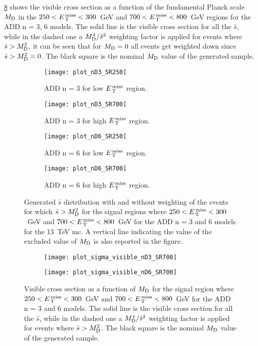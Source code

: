 \cref{fig:vis_sigma_trunc} shows the visible cross section as a function of the
fundamental Planck scale $M_\mathrm{D}$ in the $250 < E_\mathrm{\, T}^\mathrm{\, miss} < 300$~GeV and
$700 < E_\mathrm{\, T}^\mathrm{\, miss} < 800$~GeV regions for the ADD n = 3, 6 models. The solid line is
the visible cross section for all the $\hat{s}$, while in the dashed one a
$M_\mathrm{D}^4/\hat{s}^2$ weighting factor is applied for events where
$\hat{s} > M_\mathrm{D}^2$, it can be seen that for $M_\mathrm{D} = 0$ all events get weighted
down since $\hat{s} > M_\mathrm{D}^2 = 0$. The black square is the nominal $M_\mathrm{D}$ value of
the generated sample.
\begin{figure}[!h]
  \centering
  \begin{subfigure}{.48\linewidth}
    \texttt{[image: plot\_nD3\_SR250]}
    \caption{ADD n = 3 for low $E_\mathrm{\, T}^\mathrm{\, miss}$ region.}
    \label{fig:shat_n3_250}
  \end{subfigure}
  \begin{subfigure}{.48\linewidth}
    \texttt{[image: plot\_nD3\_SR700]}
    \caption{ADD n = 3 for high $E_\mathrm{\, T}^\mathrm{\, miss}$ region.}
    \label{fig:shat_n3_700}
  \end{subfigure}
  \begin{subfigure}{.48\linewidth}
    \texttt{[image: plot\_nD6\_SR250]}
    \caption{ADD n = 6 for low $E_\mathrm{\, T}^\mathrm{\, miss}$ region.}
    \label{fig:shat_n6_250}
  \end{subfigure}
  \begin{subfigure}{.48\linewidth}
    \texttt{[image: plot\_nD6\_SR700]}
    \caption{ADD n = 6 for high $E_\mathrm{\, T}^\mathrm{\, miss}$ region.}
    \label{fig:shat_n6_700}
  \end{subfigure}
  \caption{Generated $\hat{s}$ distribution with and without weighting of the
    events for which $\hat{s} > M_\mathrm{D}^2$ for the signal regions where
    $250 < E_\mathrm{\, T}^\mathrm{\, miss} < 300$~GeV and $700 < E_\mathrm{\, T}^\mathrm{\, miss} < 800$~GeV for the ADD n = 3 and 6
    models for the 13~TeV \gls{mc}. A vertical line indicating the value of the
    excluded value of $M_\mathrm{D}$ is also reported in the figure.}
  \label{fig:shat}
\end{figure}
\begin{figure}[!h]
  \centering
  \begin{subfigure}{.48\linewidth}
    \texttt{[image: plot\_sigma\_visible\_nD3\_SR700]}
    \caption{}
    \label{fig:sigma_vis_n3}
  \end{subfigure}
  \begin{subfigure}{.48\linewidth}
    \texttt{[image: plot\_sigma\_visible\_nD6\_SR700]}
    \caption{}
    \label{fig:sigma_vis_n6}
  \end{subfigure}
  \caption{Visible cross section as a function of $M_\mathrm{D}$ for the signal region
    where $250 < E_\mathrm{\, T}^\mathrm{\, miss} < 300$~GeV and $700 < E_\mathrm{\, T}^\mathrm{\, miss} < 800$~GeV for the ADD n = 3
    and 6 models. The solid line is the visible cross section for all the
    $\hat{s}$, while in the dashed one a $M_\mathrm{D}^4/\hat{s}^2$ weighting factor is
    applied for events where $\hat{s} > M_\mathrm{D}^2$. The black square is the nominal
    $M_\mathrm{D}$ value of the generated sample.}
  \label{fig:vis_sigma_trunc}
\end{figure}
